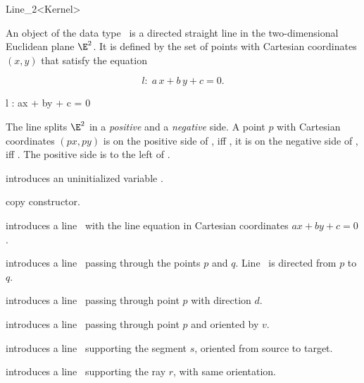 \begin{ccRefClass} {Line_2<Kernel>}

\ccDefinition
An object  of the data type \ccRefName\ is a directed
straight line in the two-dimensional Euclidean plane $\E^2$. It is
defined by the set of points with Cartesian coordinates $(x,y)$ 
that satisfy the equation 
\begin{ccTexOnly}
\[ l:\; a\, x +b\, y +c = 0. \]
\end{ccTexOnly}
\begin{ccHtmlOnly}
 l : ax + by + c = 0 
\end{ccHtmlOnly}
 
The line splits $\E^2$ in a {\em positive} and a {\em negative}
side. A point $p$ with Cartesian coordinates 
$(px, py)$ is on the positive side of , iff
, it is
on the negative side of , iff 
.
The positive side is to the left of .

\ccCreation
{}

\ccHidden {}
             {introduces an uninitialized variable \ccVar.}

\ccHidden {}
            {copy constructor.}

            {introduces a line \ccVar\ with the line equation in Cartesian
              coordinates $ax +by +c = 0$.}

            {introduces a line \ccVar\ passing through the points $p$ and $q$. 
             Line \ccVar\ is directed from $p$ to $q$.}

            {introduces a line \ccVar\ passing through point $p$ with 
             direction $d$.}

            {introduces a line \ccVar\ passing through point $p$ and
             oriented by $v$.}

            {introduces a line \ccVar\ supporting the segment $s$,
            oriented from source to target.}

            {introduces a line \ccVar\ supporting the ray $r$,
            with same orientation.}


\end{ccRefClass}
